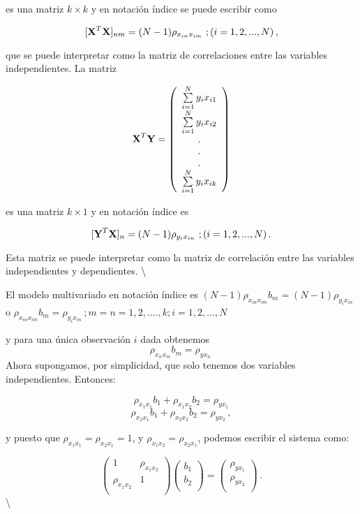 \documentclass[
]{agujournal2019}
\begin{document}
es una matriz \(k\times k\) y en notación índice se puede escribir como

\[[{\textbf X}^T{\textbf X}]_{nm}=(N-1)\rho_{x_{in} x_{im}}\,\,;(i=1,2,...,N)\,,\]

que se puede interpretar como la matriz de correlaciones entre las
variables independientes. La matriz

\[{\textbf X}^T{\textbf Y}=\left(\begin{array}{c}
  \sum\limits_{i=1}^N y_i x_{i1}\\
  \sum\limits_{i=1}^N y_i x_{i2}\\
                   . \\
           . \\
           . \\
  \sum\limits_{i=1}^N y_i x_{ik}\\
  \end{array}\right)\]

es una matriz \(k\times 1\) y en notación índice es

\[[{\textbf Y}^T{\textbf X}]_n=(N-1)\rho_{y_i x_{in}}\,\,;(i=1,2,...,N)\,.\]

Esta matriz se puede interpretar como la matriz de correlación entre las
variables independientes y dependientes. \textbackslash{}

\noindent El modelo multivariado en notación índice es
\((N-1)\rho_{x_{in} x_{im}}b_m=(N-1)\rho_{y_i x_{in}}\) o
\(\rho_{x_{in} x_{im}}b_m=\rho_{y_i x_{in}}\,;m=n=1,2,....,k; i=1,2,...,N\)

y para una única observación \(i\) dada obtenemos
\[\rho_{x_{n} x_{m}}b_m=\rho_{y x_{n}}\,\] Ahora supongamos, por
simplicidad, que solo tenemos dos variables independientes. Entonces:

\[\rho_{x_{1} x_{1}}b_1+\rho_{x_{1} x_{2}}b_2=\rho_{y x_{1}}\]
\[\rho_{x_{2} x_{1}}b_1+\rho_{x_{2} x_{2}}b_2=\rho_{y x_{2}}\,,\]

y puesto que \(\rho_{x_{1} x_{1}}=\rho_{x_{2} x_{1}}=1\), y
\(\rho_{x_{1} x_{2}}=\rho_{x_{2} x_{1}}\), podemos escribir el sistema
como:

\[\left(\begin{array}{cc}
  1 & \rho_{x_{1} x_{2}} \\
  \rho_{x_{1} x_{2}} & 1 \\
        \end{array}\right)
  \left(\begin{array}{c}
  b_1 \\
  b_2 \\
        \end{array}\right)=
     \left(\begin{array}{c}
  \rho_{y x_{1}} \\
  \rho_{y x_{2}} \\
        \end{array}\right)\,.\] \textbackslash{}
\end{document}
